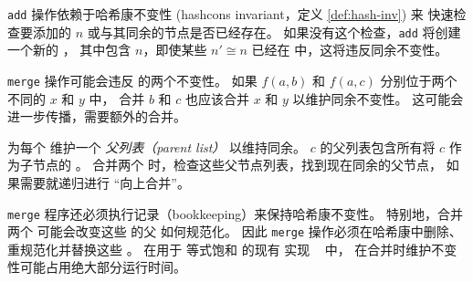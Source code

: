 \texttt{add} 操作依赖于哈希康不变性 (hashcons invariant，定义 \ref{def:hash-inv}) 来
  快速检查要添加的 \enode $n$ 或与其同余的节点是否已经存在。
如果没有这个检查，\texttt{add} 将创建一个新的 \eclass，
  其中包含 $n$，即使某些 $n' \cong n$ 已经在 \egraph 中，这将违反同余不变性。


\texttt{merge} 操作可能会违反 \egraph 的两个不变性。
如果 $f(a, b)$ 和 $f(a, c)$ 分别位于两个不同的 \eclasses $x$ 和 $y$ 中，
  合并 $b$ 和 $c$ 也应该合并 $x$ 和 $y$ 以维护同余不变性。
这可能会进一步传播，需要额外的合并。


\Egraphs 为每个 \eclass 维护一个 \textit{父列表（parent list）} 以维持同余。
\eclass $c$ 的父列表包含所有将 $c$ 作为子节点的 \enodes。
合并两个 \eclasses 时，\egraphs 检查这些父节点列表，找到现在同余的父节点，
  如果需要就递归进行 ``向上合并''。


\texttt{merge} 程序还必须执行记录（bookkeeping）来保持哈希康不变性。
特别地，合并两个 \eclasses 可能会改变这些 \eclasses 的父 \enodes 如何规范化。
  因此 \texttt{merge} 操作必须在哈希康中删除、重规范化并替换这些 \enodes。 %
在用于 等式饱和 的现有 \egraph 实现 ~\cite{herbie} 中，
  在合并时维护不变性可能占用绝大部分运行时间。

